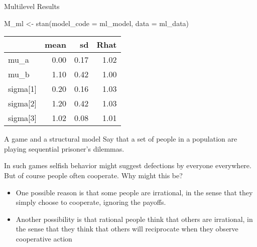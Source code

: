 \documentclass[
  11pt,
  ignorenonframetext,
]{beamer}
\newenvironment{Shaded}{\begin{snugshade}}{\end{snugshade}}
\newcommand{\AttributeTok}[1]{\textcolor[rgb]{0.40,0.45,0.13}{#1}}
\newcommand{\FunctionTok}[1]{\textcolor[rgb]{0.28,0.35,0.67}{#1}}
\newcommand{\NormalTok}[1]{\textcolor[rgb]{0.00,0.23,0.31}{#1}}
\newcommand{\OtherTok}[1]{\textcolor[rgb]{0.00,0.23,0.31}{#1}}
\providecommand{\tightlist}{%
  \setlength{\itemsep}{0pt}\setlength{\parskip}{0pt}}\usepackage{longtable,booktabs,array}
\begin{document}
\begin{frame}[fragile]{Multilevel Results}
\protect\hypertarget{multilevel-results-1}{}
\begin{Shaded}
\begin{Highlighting}[]
\NormalTok{M\_ml }\OtherTok{\textless{}{-}} \FunctionTok{stan}\NormalTok{(}\AttributeTok{model\_code =}\NormalTok{ ml\_model, }\AttributeTok{data =}\NormalTok{ ml\_data)}
\end{Highlighting}
\end{Shaded}

\begin{tabular}{l|r|r|r}
\hline
  & mean & sd & Rhat\\
\hline
mu\_a & 0.00 & 0.17 & 1.02\\
\hline
mu\_b & 1.10 & 0.42 & 1.00\\
\hline
sigma[1] & 0.20 & 0.16 & 1.03\\
\hline
sigma[2] & 1.20 & 0.42 & 1.03\\
\hline
sigma[3] & 1.02 & 0.08 & 1.01\\
\hline
\end{tabular}
\end{frame}

\begin{frame}{A game and a structural model}
\protect\hypertarget{a-game-and-a-structural-model-1}{}
Say that a set of people in a population are playing sequential
prisoner's dilemmas.

In such games selfish behavior might suggest defections by everyone
everywhere. But of course people often cooperate. Why might this be?

\begin{itemize}
\tightlist
\item
  One possible reason is that some people are irrational, in the sense
  that they simply choose to cooperate, ignoring the payoffs.
\item
  Another possibility is that rational people think that others are
  irrational, in the sense that they think that others will reciprocate
  when they observe cooperative action
\end{itemize}
\end{frame}
\end{document}
